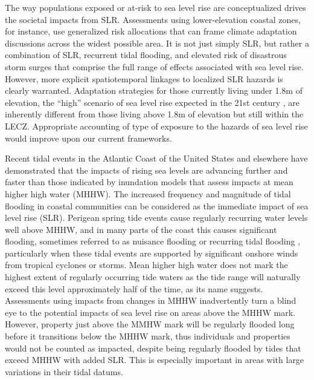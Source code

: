 \documentclass[12pt,]{article}
\begin{document}
The way populations exposed or at-risk to sea level rise are
conceptualized drives the societal impacts from SLR. Assessments using
lower-elevation coastal zones, for instance, use generalized risk
allocations that can frame climate adaptation discussions across the
widest possible area. It is not just simply SLR, but rather a
combination of SLR, recurrent tidal flooding, and elevated risk of
disastrous storm surges that comprise the full range of effects
associated with sea level rise. However, more explicit spatiotemporal
linkages to localized SLR hazards is clearly warranted. Adaptation
strategies for those currently living under 1.8m of elevation, the
``high'' scenario of sea level rise expected in the 21st century
\citep{sweet2017global}, are inherently different from those living
above 1.8m of elevation but still within the LECZ. Appropriate
accounting of type of exposure to the hazards of sea level rise would
improve upon our current frameworks.

Recent tidal events in the Atlantic Coast of the United States and
elsewhere
\citep{carbognin2010global, spanger2014encroaching, dahl2017sea} have
demonstrated that the impacts of rising sea levels are advancing further
and faster than those indicated by inundation models that assess impacts
at mean higher high water (MHHW). The increased frequency and magnitude
of tidal flooding in coastal communities can be considered as the
immediate impact of sea level rise (SLR). Perigean spring tide events
cause regularly recurring water levels well above MHHW, and in many
parts of the coast this causes significant flooding, sometimes referred
to as nuisance flooding or recurring tidal flooding
\citep{fennessey2001changes}, particularly when these tidal events are
supported by significant onshore winds from tropical cyclones or storms.
Mean higher high water does not mark the highest extent of regularly
occurring tide waters as the tide range will naturally exceed this level
approximately half of the time, as its name suggests. Assessments using
impacts from changes in MHHW inadvertently turn a blind eye to the
potential impacts of sea level rise on areas above the MHHW mark.
However, property just above the MMHW mark will be regularly flooded
long before it transitions below the MHHW mark, thus individuals and
properties would not be counted as impacted, despite being regularly
flooded by tides that exceed MHHW with added SLR. This is especially
important in areas with large variations in their tidal datums.
\end{document}
